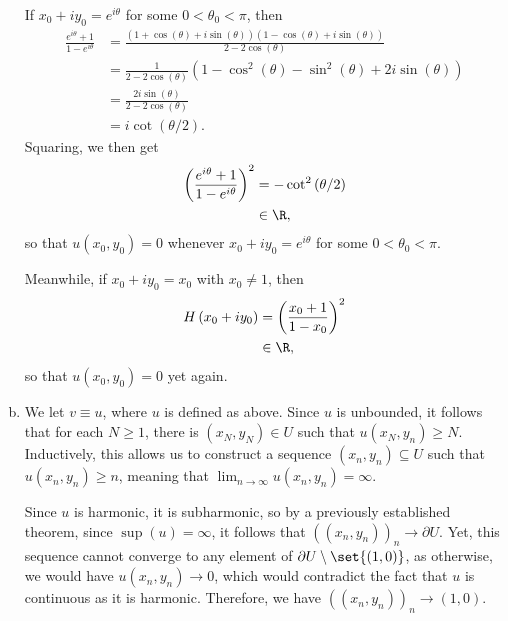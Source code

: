 \documentclass[10pt]{mypackage}
\begin{document}
\begin{solution}
\begin{enumerate}[(a)]
      If $x_0 + iy_0 = e^{i\theta}$ for some $0 < \theta_0 < \pi$, then
      \begin{align*}
        \frac{e^{i\theta} + 1}{1-e^{i\theta}} &= \frac{\left( 1 + \cos\left( \theta \right) + i\sin\left( \theta \right) \right)\left( 1 - \cos\left( \theta \right) + i\sin\left( \theta \right) \right)}{2-2\cos\left( \theta \right)}\\
                                              &= \frac{1}{2-2\cos\left( \theta \right)} \left( 1-\cos^2\left( \theta \right)-\sin^2\left( \theta \right) + 2i\sin\left( \theta \right) \right)\\
                                              &= \frac{2i\sin\left( \theta \right)}{2-2\cos\left( \theta \right)}\\
                                              &= i\cot\left( \theta/2 \right).
      \end{align*}
      Squaring, we then get
      \begin{align*}
        \left( \frac{e^{i\theta} + 1}{1-e^{i\theta}} \right)^2 &= -\cot^2\left( \theta/2 \right)\\
                                                               &\in \R,
      \end{align*}
      so that $u\left( x_0,y_0 \right) = 0$ whenever $x_0 + iy_0 = e^{i\theta}$ for some $0 < \theta_0 < \pi$.\newline

      Meanwhile, if $x_0 + iy_0 = x_0$ with $x_0\neq 1$, then
      \begin{align*}
        H\left( x_0 + iy_0 \right) &= \left( \frac{x_0 + 1}{1-x_0} \right)^2\\
                                   &\in \R,
      \end{align*}
      so that $u\left( x_0,y_0 \right) = 0$ yet again.
    \item We let $v \equiv u$, where $u$ is defined as above. Since $u$ is unbounded, it follows that for each $N\geq 1$, there is $\left( x_N,y_N \right)\in U$ such that $u\left( x_N,y_n \right) \geq N$. Inductively, this allows us to construct a sequence $\left( x_n,y_n \right)\subseteq U$ such that $u\left( x_n,y_n \right) \geq n$, meaning that $\lim_{n\rightarrow\infty}u\left( x_n,y_n \right) =\infty$.\newline

      Since $u$ is harmonic, it is subharmonic, so by a previously established theorem, since $\sup\left( u \right) = \infty$, it follows that $\left( \left( x_n,y_n \right) \right)_n\rightarrow \partial U$. Yet, this sequence cannot converge to any element of $\partial U\setminus \set{\left( 1,0 \right)}$, as otherwise, we would have $u\left( x_n,y_n \right)\rightarrow 0$, which would contradict the fact that $u$ is continuous as it is harmonic. Therefore, we have $\left( \left( x_n,y_n \right) \right)_{n}\rightarrow \left( 1,0 \right)$.
  \end{enumerate}
\end{solution}
\end{document}
